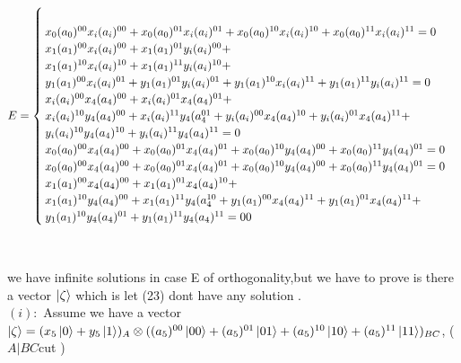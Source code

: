 \documentclass[a4paper,12pt]{article}
\begin{document}
\begin{equation}
E = \begin{cases}
\newline\\
x_{0}(a_{0})^{00}x_{i}(a_{i})^{00}+x_{0}(a_{0})^{01}x_{i}(a_{i})^{01}+x_{0}(a_{0})^{10}x_{i}(a_{i})^{10}+x_{0}(a_{0})^{11}x_{i}(a_{i})^{11}=0
\newline\\
x_{1}(a_{1})^{00}x_{i}(a_{i})^{00}+x_{1}(a_{1})^{01}y_{i}(a_{i})^{00}+\\x_{1}(a_{1})^{10}x_{i}(a_{i})^{10}+x_{1}(a_{1})^{11}y_{i}(a_{i})^{10}+\\y_{1}(a_{1})^{00}x_{i}(a_{i})^{01}+y_{1}(a_{1})^{01}y_{i}(a_{i})^{01}+y_{1}(a_{1})^{10}x_{i}(a_{i})^{11}+y_{1}(a_{1})^{11}y_{i}(a_{i})^{11}=0
\newline\\
x_{i}(a_{i})^{00}x_{4}(a_{4})^{00}+x_{i}(a_{i})^{01}x_{4}(a_{4})^{01}+\\x_{i}(a_{i})^{10}y_{4}(a_{4})^{00}+x_{i}(a_{i})^{11}y_{4}(a_{4}^{01}+y_{i}(a_{i})^{00}x_{4}(a_{4})^{10}+y_{i}(a_{i})^{01}x_{4}(a_{4})^{11}+\\y_{i}(a_{i})^{10}y_{4}(a_{4})^{10}+y_{i}(a_{i})^{11}y_{4}(a_{4})^{11}=0
\newline \\
x_{0}(a_{0})^{00}x_{4}(a_{4})^{00}+x_{0}(a_{0})^{01}x_{4}(a_{4})^{01}+x_{0}(a_{0})^{10}y_{4}(a_{4})^{00}+x_{0}(a_{0})^{11}y_{4}(a_{4})^{01}=0
\newline\\
x_{0}(a_{0})^{00}x_{4}(a_{4})^{00}+x_{0}(a_{0})^{01}x_{4}(a_{4})^{01}+x_{0}(a_{0})^{10}y_{4}(a_{4})^{00}+x_{0}(a_{0})^{11}y_{4}(a_{4})^{01}=0
\newline\\
x_{1}(a_{1})^{00}x_{4}(a_{4})^{00}+x_{1}(a_{1})^{01}x_{4}(a_{4})^{10}+\\x_{1}(a_{1})^{10}y_{4}(a_{4})^{00}+x_{1}(a_{1})^{11}y_{4}(a_{4}^{10}+y_{1}(a_{1})^{00}x_{4}(a_{4})^{11}+y_{1}(a_{1})^{01}x_{4}(a_{4})^{11}+\\y_{1}(a_{1})^{10}y_{4}(a_{4})^{01}+y_{1}(a_{1})^{11}y_{4}(a_{4})^{11}=00
\end{cases}
\end{equation}
\newline \\
\leavevmode
\newline \\
we have infinite solutions in case E of orthogonality,but we have to prove  is  there a vector  $\ket{\zeta}$ which is  let (23) dont have  any solution .
\newline \\
$(i)    :$ Assume we have a vector $\ket{\zeta}=(x_{5}\ket{0}+y_{5}\ket{1})_{A}\otimes ((a_{5})^{00}\ket{00}+(a_{5})^{01}\ket{01}+(a_{5})^{10}\ket{10}+(a_{5})^{11}\ket{11})_{BC}$,   ( $      A|BC    $cut   )
\end{document}
